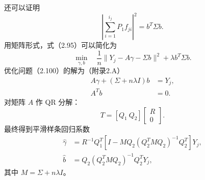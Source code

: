 还可以证明
\begin{equation}
\left|\sum_{i=1}^{i_j}P_1f_{ji}\right|^2=b^T\Sigma b.
\tag{2.99}
\end{equation}
用矩阵形式，式（2.95）可以简化为
\begin{equation}
\min_{\gamma,b}\quad
\frac1n\lVert Y_j-A\gamma-\Sigma b\rVert^2+\lambda b^T\Sigma b.
\tag{2.100}
\end{equation}
优化问题（2.100）的解为（附录2.A）
\begin{equation}
\begin{aligned}
A\gamma+(\Sigma+n\lambda I)b&=Y_j,\\
A^Tb&=0.
\end{aligned}\tag{2.101}
\end{equation}
对矩阵 $A$ 作 QR 分解：
\[
T=[Q_1\ Q_2]\begin{bmatrix}R\\0\end{bmatrix}.
\]
最终得到平滑样条回归系数
\begin{equation}
\begin{aligned}
\widehat\gamma&=
R^{-1}Q_1^T[I-MQ_2(Q_2^TMQ_2)^{-1}Q_2^T]Y_j,\\
\widehat b&=Q_2(Q_2^TMQ_2)^{-1}Q_2^TY_j,
\end{aligned}\tag{2.102}
\end{equation}
其中 $M=\Sigma+n\lambda I$。

